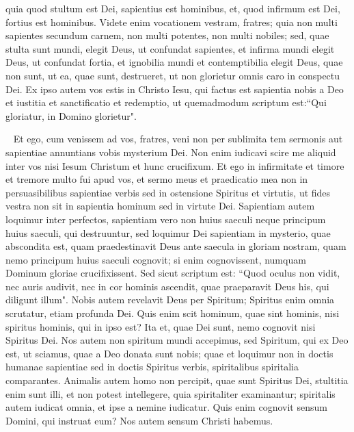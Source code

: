 \begin{biblechapter}
\verse quia quod stultum est Dei, sapientius est hominibus, et, quod infirmum est Dei, fortius est hominibus. 
\verse Videte enim vocationem vestram, fratres; quia non multi sapientes secundum carnem, non multi potentes, non multi nobiles; 
\verse sed, quae stulta sunt mundi, elegit Deus, ut confundat sapientes, et infirma mundi elegit Deus, ut confundat fortia, 
\verse et ignobilia mundi et contemptibilia elegit Deus, quae non sunt, ut ea, quae sunt, destrueret, 
\verse ut non glorietur omnis caro in conspectu Dei. 
\verse Ex ipso autem vos estis in Christo Iesu, qui factus est sapientia nobis a Deo et iustitia et sanctificatio et redemptio, 
\verse ut quemadmodum scriptum est:“Qui gloriatur, in Domino glorietur".  
\end{biblechapter}

\begin{biblechapter}  
\verse Et ego, cum venissem ad vos, fratres, veni non per sublimita tem sermonis aut sapientiae annuntians vobis mysterium Dei. 
\verse Non enim iudicavi scire me aliquid inter vos nisi Iesum Christum et hunc crucifixum. 
\verse Et ego in infirmitate et timore et tremore multo fui apud vos, 
\verse et sermo meus et praedicatio mea non in persuasibilibus sapientiae verbis sed in ostensione Spiritus et virtutis,  
\verse ut fides vestra non sit in sapientia hominum sed in virtute Dei. 
\verse Sapientiam autem loquimur inter perfectos, sapientiam vero non huius saeculi neque principum huius saeculi, qui destruuntur, 
\verse sed loquimur Dei sapientiam in mysterio, quae abscondita est, quam praedestinavit Deus ante saecula in gloriam nostram, 
\verse quam nemo principum huius saeculi cognovit; si enim cognovissent, numquam Dominum gloriae crucifixissent. 
\verse Sed sicut scriptum est: “Quod oculus non vidit, nec auris audivit, nec in cor hominis ascendit, quae praeparavit Deus his, qui diligunt illum". 
\verse Nobis autem revelavit Deus per Spiritum; Spiritus enim omnia scrutatur, etiam profunda Dei. 
\verse Quis enim scit hominum, quae sint hominis, nisi spiritus hominis, qui in ipso est? Ita et, quae Dei sunt, nemo cognovit nisi Spiritus Dei. 
\verse Nos autem non spiritum mundi accepimus, sed Spiritum, qui ex Deo est, ut sciamus, quae a Deo donata sunt nobis; 
\verse quae et loquimur non in doctis humanae sapientiae sed in doctis Spiritus verbis, spiritalibus spiritalia comparantes. 
\verse Animalis autem homo non percipit, quae sunt Spiritus Dei, stultitia enim sunt illi, et non potest intellegere, quia spiritaliter examinantur; 
\verse spiritalis autem iudicat omnia, et ipse a nemine iudicatur. 
\verse Quis enim cognovit sensum Domini, qui instruat eum? Nos autem sensum Christi habemus. 
\end{biblechapter}


